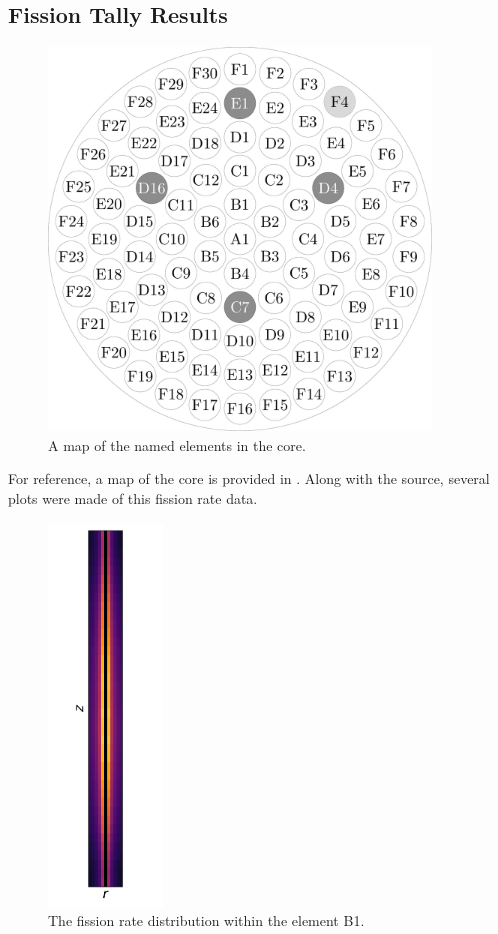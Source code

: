 \subsection{Fission Tally Results}

\begin{figure}[htb]
\centering
\includegraphics[height=4in]{tex/figures/coremap.pdf}
\caption[Core Map]{A map of the named elements in the core.}
\label{fig:coremap}
\end{figure}

For reference, a map of the core is provided in .
Along with the source, several plots were made of this fission rate data.

\begin{figure}[htb]
\centering
\includegraphics[height=4in]{tex/figures/rr_dist_B1.pdf}
\caption[Fission Rate Dist. B1]{The fission rate distribution within the element B1.}
\label{fig:rr_dist_b1}
\end{figure}

